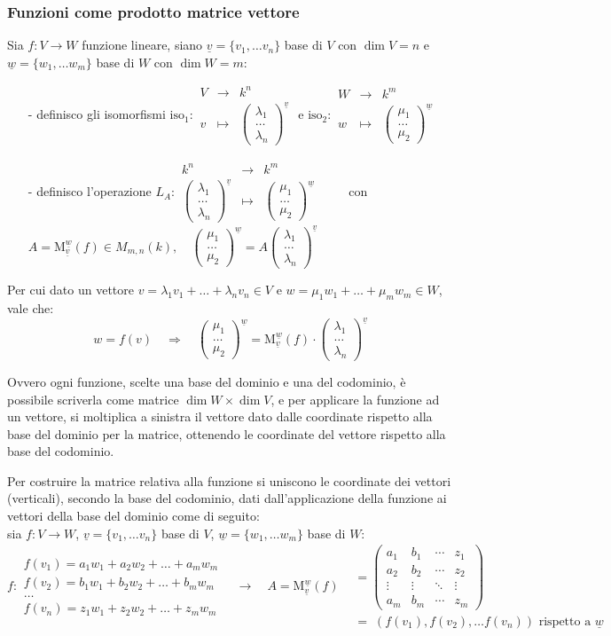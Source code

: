 \documentclass[a4paper]{article}
\newcommand\f[4]{\begin{smallmatrix} {#1} &\to &{#2} \\ {#3} &\mapsto &{#4} \end{smallmatrix}}
\newcommand\m[2]{\text{M}_{\underline{#1}}^{\underline{#2}}}
\newcommand\psmatrix[3]{\left( \begin{smallmatrix} {#1} \\ {#2} \\ {#3} \end{smallmatrix} \right)}
\begin{document}
\subsubsection*{Funzioni come prodotto matrice vettore}
Sia \(f: V \to W\) funzione lineare, siano \(\underline{v} = \{ v_1, \dots v_n \}\) base di \(V\) con \(\dim V = n\) e
\(\underline{w} = \{ w_1, \dots w_m \}\) base di \(W\) con \(\dim W = m\):
\begin{itemize}
	\item[-] definisco gli isomorfismi \(\text{iso}_1: \f{V}{k^n}{v}{\psmatrix{\lambda_1}{\dots}{\lambda_n}^{\underline{v}}}\) e \(\text{iso}_2: \f{W}{k^m}{w}{\psmatrix{\mu_1}{\dots}{\mu_2}^{\underline{w}}}\)
	\item[-] definisco l'operazione \(L_A: \f{k^n}{k^m}{\psmatrix{\lambda_1}{\dots}{\lambda_n}^{\underline{v}}}{\psmatrix{\mu_1}{\dots}{\mu_2}^{\underline{w}}} \qquad \)
	con \(A = \m{v}{w}(f) \in M_{m,n}(k), \quad \psmatrix{\mu_1}{\dots}{\mu_2}^{\underline{w}} = A \psmatrix{\lambda_1}{\dots}{\lambda_n}^{\underline{v}}\)
\end{itemize}
Per cui dato un vettore \(v = \lambda_1 v_1 + \dots + \lambda_n v_n \in V\) e \(w = \mu_1 w_1 + \dots + \mu_m w_m \in W\),
vale che: \[w = f(v) \quad \Rightarrow \quad \psmatrix{\mu_1}{\dots}{\mu_2}^{\underline{w}} = \m{v}{w}(f) \cdot \psmatrix{\lambda_1}{\dots}{\lambda_n}^{\underline{v}}\]

Ovvero ogni funzione, scelte una base del dominio e una del codominio, è possibile scriverla come matrice \(\dim W \times \dim V\),
e per applicare la funzione ad un vettore, si moltiplica a sinistra il vettore dato dalle coordinate rispetto alla base del dominio
per la matrice, ottenendo le coordinate del vettore rispetto alla base del codominio.

Per costruire la matrice relativa alla funzione si uniscono le coordinate dei vettori (verticali), secondo la base del codominio,
dati dall'applicazione della funzione ai vettori della base del dominio come di seguito: \\
sia \(f:V \to W\), \(\underline{v} = \{v_1, \dots v_n\}\) base di \(V\), \(\underline{w} = \{w_1, \dots w_m\}\) base di \(W\):
\[f: \begin{matrix}
	f(v_1) = a_1 w_1 + a_2 w_2 + \dots + a_m w_m \\
	f(v_2) = b_1 w_1 + b_2 w_2 + \dots + b_m w_m \\
	\dots \\
	f(v_n) = z_1 w_1 + z_2 w_2 + \dots + z_m w_m
\end{matrix} \quad \longrightarrow \quad A = \m{v}{w}(f)
\begin{aligned}
	&= \left( \begin{matrix}
		a_1 & b_1 & \cdots & z_1 \\
		a_2 & b_2 & \cdots & z_2 \\
		\vdots & \vdots & \ddots & \vdots \\
		a_m & b_m & \cdots & z_m
	\end{matrix} \right) \\
	&= \; \left(f(v_1), f(v_2), \dots f(v_n)\right) \text{ rispetto a } \underline{w}
\end{aligned}\]
\end{document}
